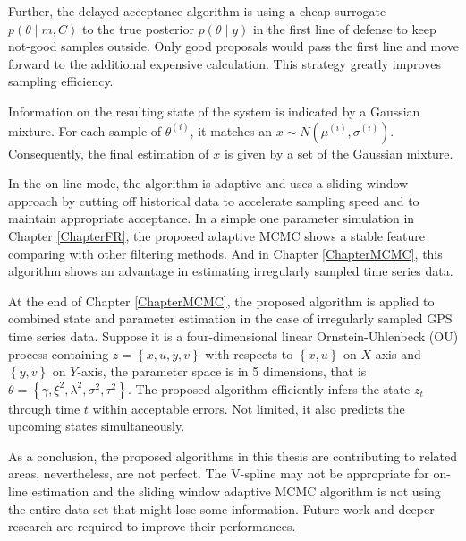 Further, the delayed-acceptance algorithm is using a cheap surrogate $p(\theta\mid m, C)$ to the true posterior $p(\theta\mid y)$ in the first line of defense to keep not-good samples outside. Only good proposals would pass the first line and move forward to the additional expensive calculation. This strategy greatly improves sampling efficiency. 

Information on the resulting state of the system is indicated by a Gaussian mixture. For each sample of $\theta^{(i)}$, it matches an $x \sim N\left(\mu^{(i)},\sigma^{(i)}\right)$. Consequently, the final estimation of $x$ is given by a set of the Gaussian mixture. 

In the on-line mode, the algorithm is adaptive and uses a sliding window approach by cutting off historical data to accelerate sampling speed and to maintain appropriate acceptance. In a simple one parameter simulation in Chapter \ref{ChapterFR}, the proposed adaptive MCMC shows a stable feature comparing with other filtering methods. And in Chapter \ref{ChapterMCMC}, this algorithm shows an advantage in estimating irregularly sampled time series data. 

At the end of Chapter \ref{ChapterMCMC}, the proposed algorithm is applied to combined state and parameter estimation in the case of irregularly sampled GPS time series data. Suppose it is a four-dimensional linear Ornstein-Uhlenbeck (OU) process containing $z=\left\lbrace x,u,y,v\right\rbrace$ with respects to $\left\lbrace x,u\right\rbrace$ on $X$-axis and $\left\lbrace y,v\right\rbrace$ on $Y$-axis, the parameter space is in 5 dimensions, that is $\theta=\left\lbrace\gamma,\xi^2,\lambda^2,\sigma^2,\tau^2\right\rbrace$. The proposed algorithm efficiently infers the state $z_t$ through time $t$ within acceptable errors. Not limited, it also predicts the upcoming states simultaneously. 

As a conclusion, the proposed algorithms in this thesis are contributing to related areas, nevertheless, are not perfect. The V-spline may not be appropriate for on-line estimation and the sliding window adaptive MCMC algorithm is not using the entire data set that might lose some information. Future work and deeper research are required to improve their performances. 
